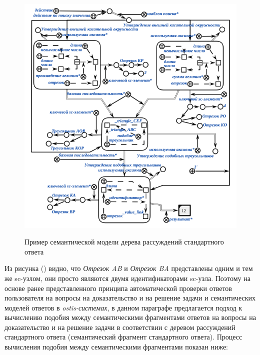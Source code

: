 \begin{figure}[H]
	\caption{Пример семантической модели дерева рассуждений стандартного ответа}
	\includegraphics[scale=0.6]{author/part7/figures/inference_tree_example_SCg.png}
	\label{fig:ITE_example}
\end{figure}

Из рисунка (\textit{}) видно, что \textit{Отрезок AB} и \textit{Отрезок BA} представлены одним и тем же sc-узлом, они просто являются двумя идентификаторами sc-узла. Поэтому на основе ранее представленного принципа автоматической проверки ответов пользователя на вопросы на доказательство и на решение задачи и семантических моделей ответов в \textit{ostis-системах}, в данном параграфе предлагается подход к вычислению подобия между семантическими фрагментами ответов на вопросы на доказательство и на решение задачи в соответствии с деревом рассуждений стандартного ответа (семантический фрагмент стандартного ответа). Процесс вычисления подобия между семантическими фрагментами показан ниже:

